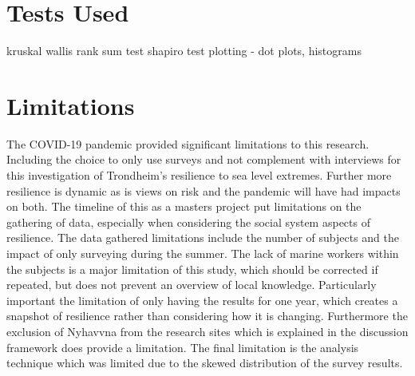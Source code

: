\section{Tests Used}
kruskal wallis rank sum test
shapiro test
plotting - dot plots, histograms


\section{Limitations}
The COVID-19 pandemic provided significant limitations to this research. Including the choice to only use surveys and not complement with interviews for this investigation of Trondheim's resilience to sea level extremes. Further more resilience is dynamic as is views on risk and the pandemic will have had impacts on both. The timeline of this as a masters project put limitations on the gathering of data, especially when considering the social system aspects of resilience. The data gathered limitations include the number of subjects and the impact of only surveying during the summer. The lack of marine workers within the subjects is a major limitation of this study, which should be corrected if repeated, but does not prevent an overview of local knowledge. Particularly important the limitation of only having the results for one year, which creates a snapshot of resilience rather than considering how it is changing. Furthermore the exclusion of Nyhavvna from the research sites which is explained in the discussion framework does provide a limitation.  The final limitation is the analysis technique which was limited due to the skewed distribution of the survey results.

